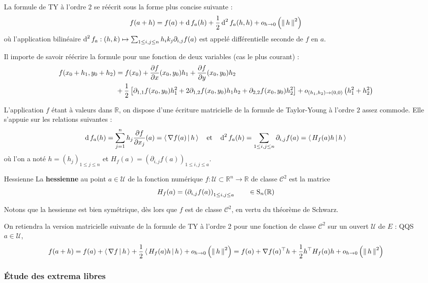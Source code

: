     La formule de TY à l’ordre 2 se réécrit sous la forme plus concise suivante : 
    \[ f(a+ h) = f(a) + \d f_a(h) + \frac{1}{2} \d^2 f_a(h,h) + \comp{o}{h}{0}{\norm{h}^2} \]    
    où l’application bilinéaire $\d^2 f_a : (h,k) \mapsto \sum_{1 \leq i , j \leq n} h_i k_j \partial_{i,j} f (a)$ est appelé différentielle seconde de $f$ en $a$. 

    Il importe de savoir réécrire la formule pour une fonction de deux variables (cas le plus courant) : 
    \begin{align*}
        f(x_0 + h_1, y_0 + h_2) &= f(x_0) + \dpart{f}{x}(x_0,y_0) h_1 + \dpart{f}{y}(x_0,y_0) h_2 \\
        &+\frac{1}{2} \left[ \partial_{1,1} f (x_0,y_0) h_1^2 + 2 \partial_{1,2} f (x_0,y_0) h_1 h_2 + \partial_{2,2} f (x_0,y_0) h_2^2 \right] + \comp{o}{(h_1,h_2)}{(0,0)}{h_1^2 + h_2^2} 
    \end{align*}

    L’application $f$ étant à valeurs dans $\mathbb{R}$, on dispose d’une écriture matricielle de la formule de Taylor-Young à l’ordre $2$ assez commode. Elle s’appuie sur les relations suivantes : 
    \[ \d f_a(h) = \sum_{j = 1}^n h_j \dpart{f}{x_j}(a) = \spr{\nabla f(a)}{h} \esp{et} \d^2 f_a(h) = \sum_{1 \leq i,j \leq n} \partial_{i,j} f(a) = \spr{H_f(a)h}{h} \]    
    où l’on a noté $h = (h_j)_{1 \leq j \leq n}$ et $H_f(a) = \left(\partial_{i,j}f(a)\right)_{1 \leq i,j \leq a}$.

    \begin{defi}{Hessienne}{}
        La \textbf{hessienne} au point $a \in \mathcal{U}$ de la fonction numérique $f : \mathcal{U} \subset \mathbb{R}^n \to \mathbb{R}$ de classe $\mathcal{C}^2$ est la matrice 
        \[ H_f(a) = \left(\partial_{i,j}f(a)\right)_{1 \leq i,j \leq a} \qquad \in \S_n(\mathbb{R}) \]   
    \end{defi}

    Notons que la hessienne est bien symétrique, dès lors que $f$ est de classe $\mathcal{C}^2$, en vertu du théorème de Schwarz.

    On retiendra la version matricielle suivante de la formule de TY à l’ordre 2 pour une fonction de classe $\mathcal{C}^2$ sur un ouvert $\mathcal{U}$ de $E$ : QQS $a \in \mathcal{U}$, 
    \[ f(a+h) = f(a) + \spr{\nabla f}{h} + \frac{1}{2} \spr{H_f(a)h}{h} + \comp{o}{h}{0}{\norm{h}^2} = f(a) + \nabla f (a)^{\top} h + \frac{1}{2} h^{\top} H_f(a) h + \comp{o}{h}{0}{\norm{h}^2} \]   

    \subsubsection{Étude des extrema libres}

